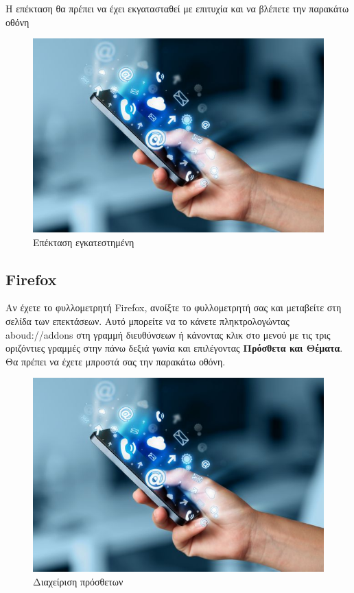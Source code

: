 \documentclass{article}
\begin{document}
Η επέκταση θα πρέπει να έχει εκγατασταθεί με επιτυχία και να βλέπετε την παρακάτω οθόνη
\begin{figure}[H]
    \includegraphics[width=\textwidth]{logo}
    \caption*{Επέκταση εγκατεστημένη}
\end{figure}

\subsection*{Firefox}
Αν έχετε το φυλλομετρητή Firefox, ανοίξτε το φυλλομετρητή σας και μεταβείτε στη σελίδα των επεκτάσεων. Αυτό μπορείτε να το κάνετε πληκτρολογώντας aboud://addons στη γραμμή διευθύνσεων ή κάνοντας κλικ στο μενού με τις τρις οριζόντιες γραμμές στην πάνω δεξιά γωνία και επιλέγοντας \textbf{Πρόσθετα και Θέματα}. Θα πρέπει να έχετε μπροστά σας την παρακάτω οθόνη.

\begin{figure}[H]
    \includegraphics[width=\textwidth]{logo}
    \caption*{Διαχείριση πρόσθετων}
\end{figure}
\end{document}
